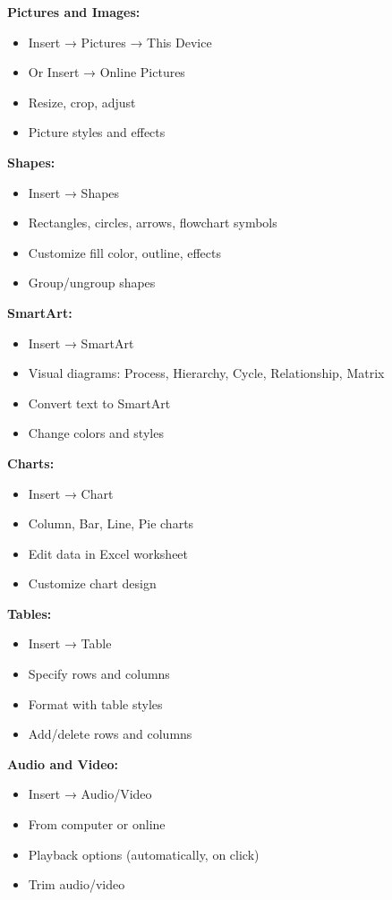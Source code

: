 \documentclass[12pt,a4paper]{article}
\begin{document}
\textbf{Pictures and Images:}
\begin{itemize}
    \item Insert → Pictures → This Device
    \item Or Insert → Online Pictures
    \item Resize, crop, adjust
    \item Picture styles and effects
\end{itemize}

\textbf{Shapes:}
\begin{itemize}
    \item Insert → Shapes
    \item Rectangles, circles, arrows, flowchart symbols
    \item Customize fill color, outline, effects
    \item Group/ungroup shapes
\end{itemize}

\textbf{SmartArt:}
\begin{itemize}
    \item Insert → SmartArt
    \item Visual diagrams: Process, Hierarchy, Cycle, Relationship, Matrix
    \item Convert text to SmartArt
    \item Change colors and styles
\end{itemize}

\textbf{Charts:}
\begin{itemize}
    \item Insert → Chart
    \item Column, Bar, Line, Pie charts
    \item Edit data in Excel worksheet
    \item Customize chart design
\end{itemize}

\textbf{Tables:}
\begin{itemize}
    \item Insert → Table
    \item Specify rows and columns
    \item Format with table styles
    \item Add/delete rows and columns
\end{itemize}

\textbf{Audio and Video:}
\begin{itemize}
    \item Insert → Audio/Video
    \item From computer or online
    \item Playback options (automatically, on click)
    \item Trim audio/video
\end{itemize}
\end{document}
